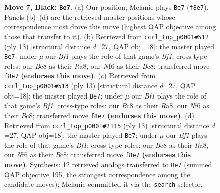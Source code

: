\documentclass[11pt]{article}
\begin{document}
\begin{figure}[p]
\caption{\textbf{Move 7, Black: \texttt{Be7}.} (a) Our position; Melanie plays \texttt{Be7} (\texttt{f8e7}). Panels (b)--(d) are the retrieved master positions whose correspondence most drove this move (highest QAP objective among those that transfer to it). (b) Retrieved from \texttt{ccrl\_top\_p0001\#512} (ply 13) [structural distance $d$=27, QAP obj=18]: the master played \texttt{Be7}; under $\mu$ our \emph{Bf1} plays the role of that game's \emph{Bf1}; cross-type roles: our \emph{B}c8 as their \emph{R}a8, our \emph{N}f6 as their \emph{B}c8; transferred move \texttt{f8e7} \textbf{(endorses this move)}. (c) Retrieved from \texttt{ccrl\_top\_p0001\#513} (ply 13) [structural distance $d$=27, QAP obj=18]: the master played \texttt{Be7}; under $\mu$ our \emph{Bf1} plays the role of that game's \emph{Bf1}; cross-type roles: our \emph{B}c8 as their \emph{R}a8, our \emph{N}f6 as their \emph{B}c8; transferred move \texttt{f8e7} \textbf{(endorses this move)}. (d) Retrieved from \texttt{ccrl\_top\_p0001\#2115} (ply 13) [structural distance $d$=27, QAP obj=18]: the master played \texttt{Be7}; under $\mu$ our \emph{Bf1} plays the role of that game's \emph{Bf1}; cross-type roles: our \emph{B}c8 as their \emph{R}a8, our \emph{N}f6 as their \emph{B}c8; transferred move \texttt{f8e7} \textbf{(endorses this move)}. Synthesis: 12 retrieved analogs transferred to \texttt{Be7} (summed QAP objective 195, the strongest correspondence among the candidate moves); Melanie committed it via the \texttt{search} selector.}
\label{fig:thought-m13}
\end{figure}

\clearpage
\end{document}
